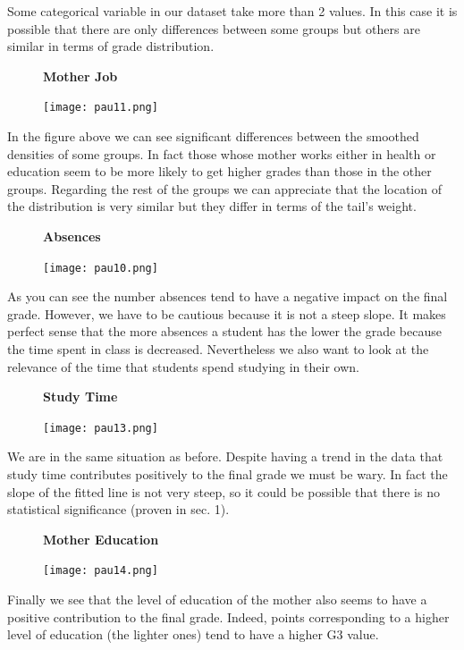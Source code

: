 \documentclass[a4paper, 11pt]{report}
\theoremstyle{definition}
\numberwithin{equation}{section}		%
\numberwithin{figure}{section}			%
\numberwithin{table}{section}				%
\begin{document}
\newpage
Some categorical variable in our dataset take more than 2 values. In this case it is possible that there are only differences between some groups but others are similar in terms of grade distribution.\\
\begin{figure}[h]\centering
\textbf{Mother Job}\par\medskip
\texttt{[image: pau11.png]}

\end{figure}
In the figure above we can see significant differences between the smoothed densities of some groups. In fact those whose mother works either in health or education seem to be more likely to get higher grades than those in the other groups. Regarding the rest of the groups we can appreciate that the location of the distribution is very similar but they differ in terms of the tail's weight.\\
\begin{figure}[h]\centering
\textbf{Absences}\par\medskip
\texttt{[image: pau10.png]}
\end{figure}
As you can see the number absences tend to have a negative impact on the final grade. However, we have to be cautious because it is not a steep slope.
\newpage
It makes perfect sense that the more absences a student has the lower the grade because the time spent in class is decreased. Nevertheless we also want to look at the relevance of the time that students spend studying in their own.
\begin{figure}[h]\centering
\textbf{Study Time}\par\medskip
\texttt{[image: pau13.png]}
\end{figure}
We are in the same situation as before. Despite having a trend in the data that study time contributes positively to the final grade we must be wary. In fact the slope of the fitted line is not very steep, so it could be possible that there is no statistical significance (proven in sec. 1). \\[0.3in]
\begin{figure}[h]\centering
\textbf{Mother Education}\par\medskip
\texttt{[image: pau14.png]}
\end{figure}
Finally we see that the level of education of the mother also seems to have a positive contribution to the final grade. Indeed, points corresponding to a higher level of education (the lighter ones) tend to have a higher G3 value.
\end{document}
